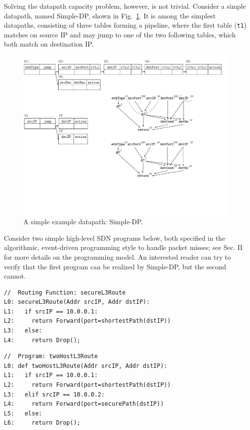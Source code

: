 Solving the datapath capacity problem, however, is not trivial. 
Consider a simple datapath, named Simple-DP, shown in Fig.~\ref{fig:fig1-update}. It is among the simplest datapaths, consisting of three tables forming a pipeline, where the first table (\texttt{t1}) matches on source IP and may jump to one of the two following tables, which both match on destination IP.
\begin{figure}[h!]
    \centering
    \vspace{-0.1in}
    \includegraphics[scale = 0.7]{figures/figure1.pdf}
    \vspace{-0.1in}
    \caption{A simple example datapath: Simple-DP.}
    \vspace{-0.1in}
    \label{fig:fig1-update}
\end{figure}

Consider two simple high-level SDN programs below, both specified in the algorithmic, event-driven programming style to handle packet misses; see Sec. II for more details on the programming model. An interested reader can try to verify that the first program can be realized by Simple-DP, but the second cannot. 
{\small
\begin{verbatim}
//  Routing Function: secureL3Route
L0: secureL3Route(Addr srcIP, Addr dstIP):
L1:   if srcIP == 10.0.0.1:
L2:     return Forward(port=shortestPath(dstIP))
L3:   else:
L4:     return Drop();
\end{verbatim}
}

{\small
\begin{verbatim}
//  Program: twoHostL3Route
L0: def twoHostL3Route(Addr srcIP, Addr dstIP):
L1:   if srcIP == 10.0.0.1:
L2:     return Forward(port=shortestPath(dstIP)) 
L3:   elif srcIP == 10.0.0.2:
L4:     return Forward(port=securePath(dstIP))
L5:   else:
L6:     return Drop();
\end{verbatim}}

